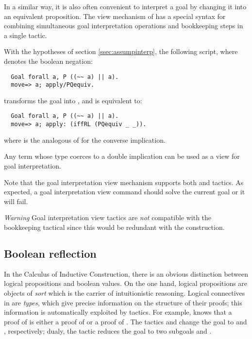 In a similar way, it is also often convenient to interpret a goal by changing
it into an equivalent proposition. The view mechanism of \ssr{} has a
special syntax  for combining simultaneous goal
interpretation operations and
bookkeeping steps in a single tactic.

With the hypotheses of section \ref{ssec:assumpinterp}, the following
script, where \C{\~\~} denotes the boolean negation:
\begin{lstlisting}
  Goal forall a, P ((~~ a) || a).
  move=> a; apply/PQequiv.
\end{lstlisting}
transforms the goal into , and is equivalent to:
\begin{lstlisting}
  Goal forall a, P ((~~ a) || a).
  move=> a; apply: (iffRL (PQequiv _ _)).
\end{lstlisting}
where  is the analogous of  for the converse
implication.

Any \ssr{} term whose type coerces to a double implication can be used
as a view for goal interpretation.

Note that the goal interpretation view mechanism supports both
 and  tactics. As expected, a goal interpretation
view command  should solve the current goal or it will
fail.


\emph{Warning} Goal interpretation view tactics are \emph{not} compatible
with the bookkeeping tactical \C{=>} since this would be redundant with
the  construction.

\subsection{Boolean reflection}\label{ssec:boolrefl}
In the Calculus of Inductive Construction, there is
an obvious distinction between logical propositions and boolean values.
On the one hand, logical propositions are objects
of \emph{sort}  which is the carrier of intuitionistic
reasoning. Logical connectives in  are \emph{types}, which give precise
information on the structure of their proofs; this information is
automatically exploited by \Coq{} tactics. For example, \Coq{} knows that a
proof of  is either a proof of  or a proof of .
The tactics  and  change the goal 
to  and , respectively; dualy, the tactic  reduces the goal
 to two subgoals  and .

